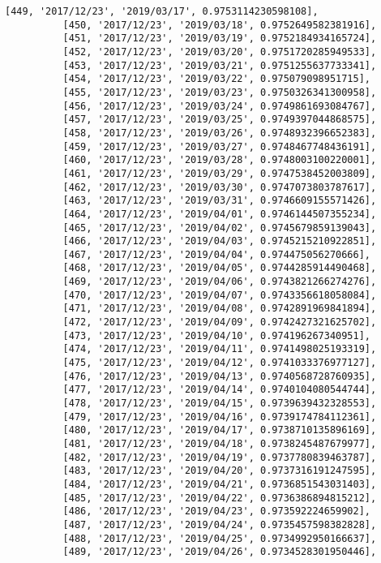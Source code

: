 \documentclass[11pt]{article}
\begin{document}
\begin{Verbatim}[commandchars=\\\{\}]
          [449, '2017/12/23', '2019/03/17', 0.9753114230598108],
          [450, '2017/12/23', '2019/03/18', 0.9752649582381916],
          [451, '2017/12/23', '2019/03/19', 0.9752184934165724],
          [452, '2017/12/23', '2019/03/20', 0.9751720285949533],
          [453, '2017/12/23', '2019/03/21', 0.9751255637733341],
          [454, '2017/12/23', '2019/03/22', 0.975079098951715],
          [455, '2017/12/23', '2019/03/23', 0.9750326341300958],
          [456, '2017/12/23', '2019/03/24', 0.9749861693084767],
          [457, '2017/12/23', '2019/03/25', 0.9749397044868575],
          [458, '2017/12/23', '2019/03/26', 0.9748932396652383],
          [459, '2017/12/23', '2019/03/27', 0.9748467748436191],
          [460, '2017/12/23', '2019/03/28', 0.9748003100220001],
          [461, '2017/12/23', '2019/03/29', 0.9747538452003809],
          [462, '2017/12/23', '2019/03/30', 0.9747073803787617],
          [463, '2017/12/23', '2019/03/31', 0.9746609155571426],
          [464, '2017/12/23', '2019/04/01', 0.9746144507355234],
          [465, '2017/12/23', '2019/04/02', 0.9745679859139043],
          [466, '2017/12/23', '2019/04/03', 0.9745215210922851],
          [467, '2017/12/23', '2019/04/04', 0.974475056270666],
          [468, '2017/12/23', '2019/04/05', 0.9744285914490468],
          [469, '2017/12/23', '2019/04/06', 0.9743821266274276],
          [470, '2017/12/23', '2019/04/07', 0.9743356618058084],
          [471, '2017/12/23', '2019/04/08', 0.9742891969841894],
          [472, '2017/12/23', '2019/04/09', 0.9742427321625702],
          [473, '2017/12/23', '2019/04/10', 0.974196267340951],
          [474, '2017/12/23', '2019/04/11', 0.9741498025193319],
          [475, '2017/12/23', '2019/04/12', 0.9741033376977127],
          [476, '2017/12/23', '2019/04/13', 0.9740568728760935],
          [477, '2017/12/23', '2019/04/14', 0.9740104080544744],
          [478, '2017/12/23', '2019/04/15', 0.9739639432328553],
          [479, '2017/12/23', '2019/04/16', 0.9739174784112361],
          [480, '2017/12/23', '2019/04/17', 0.9738710135896169],
          [481, '2017/12/23', '2019/04/18', 0.9738245487679977],
          [482, '2017/12/23', '2019/04/19', 0.9737780839463787],
          [483, '2017/12/23', '2019/04/20', 0.9737316191247595],
          [484, '2017/12/23', '2019/04/21', 0.9736851543031403],
          [485, '2017/12/23', '2019/04/22', 0.9736386894815212],
          [486, '2017/12/23', '2019/04/23', 0.973592224659902],
          [487, '2017/12/23', '2019/04/24', 0.9735457598382828],
          [488, '2017/12/23', '2019/04/25', 0.9734992950166637],
          [489, '2017/12/23', '2019/04/26', 0.9734528301950446],

\end{Verbatim}
\end{document}
